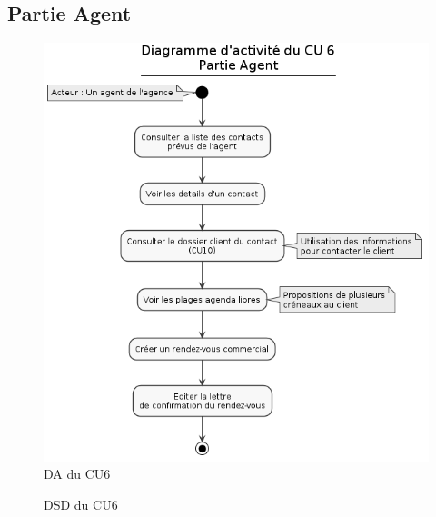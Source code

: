 \subsection{Partie Agent}
\begin{figure}[h]
\centering
\includegraphics[width=\textwidth]{figures/DA_CU6_partieAgent.png}
\caption{DA du CU6}
\end{figure}

\begin{figure}[h]
\centering
\caption{DSD du CU6}
\end{figure}

